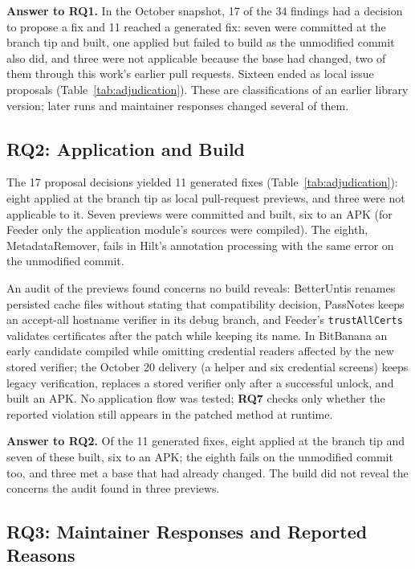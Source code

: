 \documentclass[conference]{IEEEtran}
\newcommand{\researchq}[1]{\textbf{RQ#1}}
\begin{document}
\textbf{Answer to \researchq{1}.} In the October snapshot, 17 of the 34
findings had a decision to propose a fix and 11 reached a generated fix: seven
were committed at the branch tip and built, one applied but failed to build as
the unmodified commit also did, and three were not applicable because the base
had changed, two of them through this work's earlier pull requests. Sixteen
ended as local issue proposals (Table~\ref{tab:adjudication}). These are classifications of an earlier library version;
later runs and maintainer responses changed several of them.

\subsection{\researchq{2}: Application and Build}
\label{subsec:rq2}

The 17 proposal decisions yielded 11 generated fixes
(Table~\ref{tab:adjudication}): eight applied at the branch tip as local
pull-request previews, and three were not applicable to it. Seven previews were
committed and built, six to an APK (for Feeder only the application module's
sources were compiled). The eighth, MetadataRemover, fails in Hilt's
annotation processing with the same error on the unmodified commit.

An audit of the previews found concerns no build reveals: BetterUntis renames
persisted cache files without stating that compatibility decision, PassNotes
keeps an accept-all hostname verifier in its debug branch, and Feeder's
\texttt{trustAllCerts} validates certificates after the patch while keeping
its name. In BitBanana an early candidate compiled while omitting credential
readers affected by the new stored verifier; the October 20 delivery (a
helper and six credential screens) keeps legacy verification, replaces a
stored verifier only after a successful unlock, and built an APK. No
application flow was tested; \researchq{7} checks only whether the reported
violation still appears in the patched method at runtime.

\textbf{Answer to \researchq{2}.} Of the 11 generated fixes, eight applied at
the branch tip and seven of these built, six to an APK; the eighth fails on the
unmodified commit too, and three met a base that had already changed. The build
did not reveal the concerns the audit found in three previews.

\subsection{\researchq{3}: Maintainer Responses and Reported Reasons}
\label{subsec:rq3}
\end{document}
